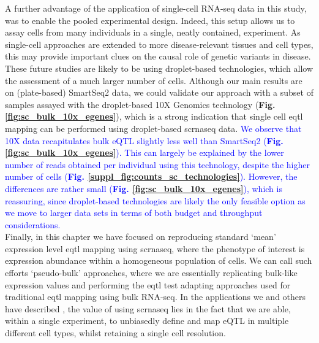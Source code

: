 A further advantage of the application of single-cell RNA-seq data in this study, was to enable the pooled experimental design. 
Indeed, this setup allows us to assay cells from many individuals in a single, neatly contained, experiment.
As single-cell approaches are extended to more disease-relevant tissues and cell types, this may provide important clues on the causal role of genetic variants in disease. 
\\

These future studies are likely to be using droplet-based technologies, which allow the assessment of a much larger number of cells.
Although our main results are on (plate-based) SmartSeq2 data, we could validate our approach with a subset of samples assayed with the droplet-based 10X Genomics technology (\textbf{Fig. \ref{fig:sc_bulk_10x_egenes}}), which is a strong indication that single cell \gls{eqtl} mapping can be performed using droplet-based \gls{scrnaseq} data. 
\textcolor{blue}{We observe that 10X data recapitulates bulk eQTL slightly less well than SmartSeq2 (\textbf{Fig. \ref{fig:sc_bulk_10x_egenes}}).
This can largely be explained by the lower number of reads obtained per individual using this technology, despite the higher number of cells (\textbf{Fig. \ref{suppl_fig:counts_sc_technologies}}).
However, the differences are rather small (\textbf{Fig. \ref{fig:sc_bulk_10x_egenes}}), which is reassuring, since droplet-based technologies are likely the only feasible option as we move to larger data sets in terms of both budget and throughput considerations.}\\

Finally, in this chapter we have focused on reproducing standard `mean' expression level \gls{eqtl} mapping using \gls{scrnaseq}, where the phenotype of interest is expression abundance within a homogeneous population of cells.
We can call such efforts `pseudo-bulk' approaches, where we are essentially replicating bulk-like expression values and performing the \gls{eqtl} test adapting approaches used for traditional \gls{eqtl} mapping using bulk RNA-seq. 
In the applications we and others have described \cite{van2018single,cuomo2020single}, the value of using \gls{scrnaseq} lies in the fact that we are able, within a single experiment, to unbiasedly define and map eQTL in multiple different cell types, whilst retaining a single cell resolution.\\

